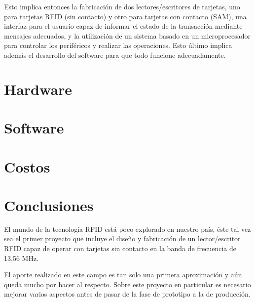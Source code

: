 \documentclass[%
        final,
        notitlepage,
        narroweqnarray,
        inline,
        ]{ieee}
\begin{document}
\bigskip
Esto implica entonces la fabricación de dos lectores/escritores de tarjetas, uno para tarjetas RFID (sin contacto) y
otro para tarjetas con contacto (SAM), una interfaz para el usuario capaz de informar el estado de la transacción
mediante mensajes adecuados, y la utilización de un sistema basado en un microprocesador para controlar los periféricos
y realizar las operaciones. Esto último implica además el desarrollo del software para que todo funcione adecuadamente.


\bigskip
\section{Hardware}


\bigskip
\section{Software}


\bigskip
\section{Costos}


\bigskip
\section{Conclusiones}
El mundo de la tecnología RFID está poco explorado en nuestro país, éste 
tal vez sea el primer proyecto que incluye el diseño y fabricación de un 
lector/escritor RFID capaz de operar con tarjetas sin contacto en la banda de
frecuencia de 13,56 MHz.

El aporte realizado en este campo es tan solo una primera aproximación y aún 
queda mucho por hacer al respecto. Sobre este proyecto en particular es
necesario mejorar varios aspectos antes de pasar de la fase de prototipo
a la de producción.
\end{document}
